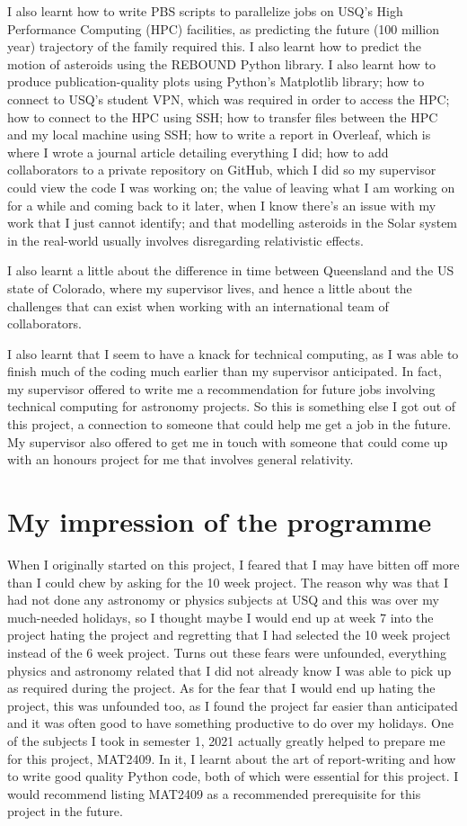 \documentclass[12pt,a4paper,openright]{article}
\begin{document}
I also learnt how to write PBS scripts to parallelize jobs on USQ's High Performance Computing (HPC) facilities, as predicting the future (100 million year) trajectory of the family required this. I also learnt how to predict the motion of asteroids using the REBOUND Python library. I also learnt how to produce publication-quality plots using Python's Matplotlib library; how to connect to USQ's student VPN, which was required in order to access the HPC; how to connect to the HPC using SSH; how to transfer files between the HPC and my local machine using SSH; how to write a report in Overleaf, which is where I wrote a journal article detailing everything I did; how to add collaborators to a private repository on GitHub, which I did so my supervisor could view the code I was working on; the value of leaving what I am working on for a while and coming back to it later, when I know there's an issue with my work that I just cannot identify; and that modelling asteroids in the Solar system in the real-world usually involves disregarding relativistic effects.

I also learnt a little about the difference in time between Queensland and the US state of Colorado, where my supervisor lives, and hence a little about the challenges that can exist when working with an international team of collaborators.

I also learnt that I seem to have a knack for technical computing, as I was able to finish much of the coding much earlier than my supervisor anticipated. In fact, my supervisor offered to write me a recommendation for future jobs involving technical computing for astronomy projects. So this is something else I got out of this project, a connection to someone that could help me get a job in the future. My supervisor also offered to get me in touch with someone that could come up with an honours project for me that involves general relativity. 

\section{My impression of the programme}
When I originally started on this project, I feared that I may have bitten off more than I could chew by asking for the 10 week project. The reason why was that I had not done any astronomy or physics subjects at USQ and this was over my much-needed holidays, so I thought maybe I would end up at week 7 into the project hating the project and regretting that I had selected the 10 week project instead of the 6 week project. Turns out these fears were unfounded, everything physics and astronomy related that I did not already know I was able to pick up as required during the project. As for the fear that I would end up hating the project, this was unfounded too, as I found the project far easier than anticipated and it was often good to have something productive to do over my holidays. One of the subjects I took in semester 1, 2021 actually greatly helped to prepare me for this project, MAT2409. In it, I learnt about the art of report-writing and how to write good quality Python code, both of which were essential for this project. I would recommend listing MAT2409 as a recommended prerequisite for this project in the future. 
\end{document}
